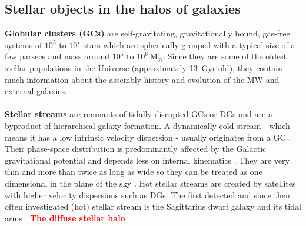 \subsection{Stellar objects in the halos of galaxies}\label{subsec:halo_objects}
\textbf{Globular clusters (\acp{GC})} are self-gravitating, gravitationally bound, gas-free systems of $10^5$ to $10^7$ stars which are spherically grouped with a typical size of a few parsecs and mass around $10^5$ to $10^6\ \mathrm{M}_\odot$. Since they are some of the oldest stellar populations in the Universe (approximately \SI{13}{Gyr} old), they contain much information about the assembly history and evolution of the \ac{MW} and external galaxies. \\\\
\textbf{Stellar streams} are remnants of tidally disrupted \acp{GC} or \acp{DG} and are a byproduct of hierarchical galaxy formation. A dynamically cold stream - which means it has a low intrinsic velocity dispersion - usually originates from a \ac{GC} \citep{Bonaca...streamsinfo...2018}. Their phase-space distribution is predominantly affected by the Galactic gravitational potential and depends less on internal kinematics \citep{Kupper...streams...2010, Kupper...streams...2012}. They are very thin and more than twice as long as wide so they can be treated as one dimensional in the plane of the sky \citep{Bonaca...streamsinfo...2018}. Hot stellar streams are created by satellites with higher velocity dispersions such as \acp{DG}. The first detected and since then often investigated (hot) stellar stream is the Sagittarius dwarf galaxy and its tidal arms \citep{Ibata...Sagittarius....1994}.
\textbf{\textcolor{red}{The diffuse stellar halo}}
